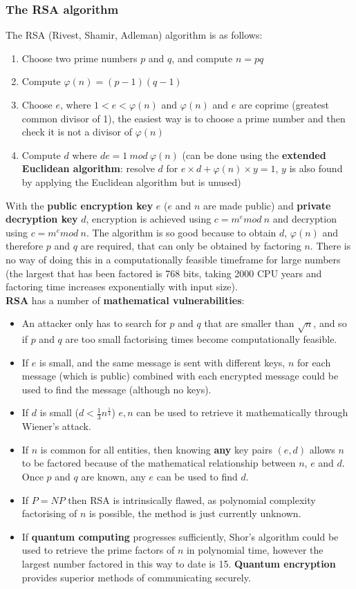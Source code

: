 \documentclass{article}
\newcommand{\np}{\vspace{8pt} \\}
\begin{document}
\subsubsection{The RSA algorithm}
The RSA (Rivest, Shamir, Adleman) algorithm is as follows:
\begin{enumerate}
	\item Choose two prime numbers $ p $ and $ q $, and compute $ n = pq $
	\item Compute $ \varphi(n) = (p-1)(q-1) $
	\item Choose $ e $, where $ 1 < e < \varphi(n) $ and $ \varphi(n) $ and $ e $ are coprime (greatest common divisor of 1), the easiest way is to choose a prime number and then check it is not a divisor of $ \varphi(n) $
	\item Compute $ d $ where $ de = 1\ mod\ \varphi(n) $ (can be done using the \textbf{extended Euclidean algorithm}: resolve $ d $ for $ e \times d + \varphi(n) \times y = 1 $, $ y $ is also found by applying the Euclidean algorithm but is unused)
\end{enumerate}
With the \textbf{public encryption key} $ e $ ($ e $ and $ n $ are made public) and \textbf{private decryption key} $ d $, encryption is achieved using $ c = m^{e} mod\ n $ and decryption using $ c = m^{e} mod\ n $. The algorithm is so good because to obtain $ d $, $ \varphi(n) $ and therefore $ p $ and $ q $ are required, that can only be obtained by factoring $ n $. There is no way of doing this in a computationally feasible timeframe for large numbers (the largest that has been factored is 768 bits, taking 2000 CPU years and factoring time increases exponentially with input size). \np
\textbf{RSA} has a number of \textbf{mathematical vulnerabilities}:
\begin{itemize}
	\item An attacker only has to search for $ p $ and $ q $ that are smaller than $ \sqrt{n} $, and so if $ p $ and $ q $ are too small factorising times become computationally feasible.
	\item If $ e $ is small, and the same message is sent with different keys, $ n $ for each message (which is public) combined with each encrypted message could be used to find the message (although no keys).
	\item If $ d $ is small ($ d < \frac{1}{3} n^{\frac{1}{4}} $) $ e, n $ can be used to retrieve it mathematically through Wiener's attack.
	\item If $ n $ is common for all entities, then knowing \textbf{any} key pairs $ (e, d) $ allows $ n $ to be factored because of the mathematical relationship between $ n $, $ e $ and $ d $. Once $ p $ and $ q $ are known, any $ e $ can be used to find $ d $.
	\item If $ P = NP $ then RSA is intrinsically flawed, as polynomial complexity factorising of $ n $ is possible, the method is just currently unknown.
	\item If \textbf{quantum computing} progresses sufficiently, Shor's algorithm could be used to retrieve the prime factors of $ n $ in polynomial time, however the largest number factored in this way to date is 15. \textbf{Quantum encryption} provides superior methods of communicating securely.
\end{itemize}
\end{document}
